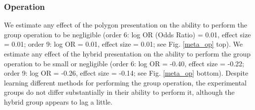 \documentclass[man,10pt]{apa6}
\begin{document}
\subsubsection{Operation}
We estimate any effect of the polygon presentation on the ability to perform the group operation to be negligible (order 6: log OR (Odds Ratio) = 0.01, effect size = 0.01; order 9: log OR = 0.01, effect size = 0.01; see Fig. \ref{meta_op} top). We estimate any effect of the hybrid presentation on the ability to perform the group operation to be small or negligible (order 6: log OR = -0.40, effect size = -0.22; order 9: log OR = -0.26, effect size = -0.14; see Fig. \ref{meta_op} bottom). Despite learning different methods for performing the group operation, the experimental groups do not differ substantially in their ability to perform it, although the hybrid group appears to lag a little. 
\end{document}
